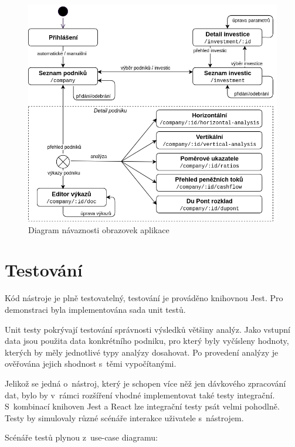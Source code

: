 \begin{figure}[!htb]
  \centering
  \includegraphics[width=14cm]{img/screens.png}
  \caption{Diagram návaznosti obrazovek aplikace}
\end{figure}

\section{Testování}
Kód nástroje je plně testovatelný, testování je prováděno knihovnou Jest. Pro demonstraci byla implementována sada unit testů. 

Unit testy pokrývají testování správnosti výsledků většiny analýz. Jako vstupní data jsou použita data konkrétního podniku, pro který byly vyčísleny hodnoty, kterých by měly jednotlivé typy analýzy dosahovat. Po provedení analýzy je ověřována jejich shodnost s~těmi vypočítanými.

Jelikož se jedná o~nástroj, který je schopen více něž jen dávkového zpracování dat, bylo by v~rámci rozšíření vhodné implementovat také testy integrační. S~kombinací knihoven Jest a React lze integrační testy psát velmi pohodlně. Testy by simulovaly různé scénáře interakce uživatele s~nástrojem.

\pagebreak
Scénáře testů plynou z~use-case diagramu:

